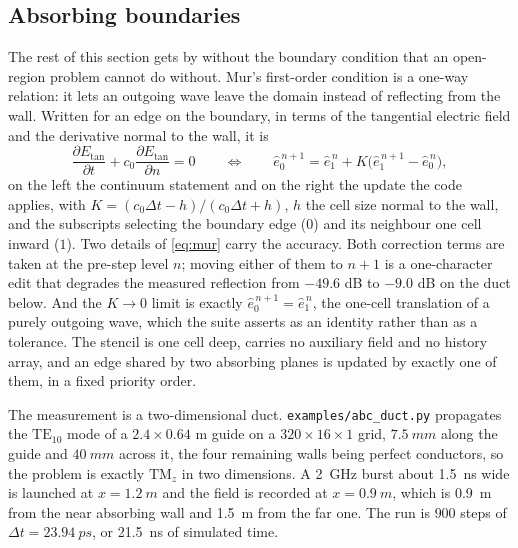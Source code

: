 \subsection{Absorbing boundaries}
\label{sec:res-abc}

The rest of this section gets by without the boundary condition that an open-region problem cannot do
without. Mur's first-order condition \cite{mur1981} is a one-way relation: it lets an outgoing wave leave the
domain instead of reflecting from the wall. Written for an edge on the boundary, in terms of the tangential
electric field and the derivative normal to the wall, it is
\begin{equation}
  \frac{\partial E_{\mathrm{tan}}}{\partial t}
  + c_0\frac{\partial E_{\mathrm{tan}}}{\partial n} = 0
  \qquad\Longleftrightarrow\qquad
  \hat e^{\,n+1}_{0} = \hat e^{\,n}_{1}
  + K\bigl(\hat e^{\,n+1}_{1} - \hat e^{\,n}_{0}\bigr),
  \label{eq:mur}
\end{equation}
on the left the continuum statement and on the right the update the code applies, with
$K=(c_0\Delta t-h)/(c_0\Delta t+h)$, $h$ the cell size normal to the wall, and the subscripts selecting the
boundary edge ($0$) and its neighbour one cell inward ($1$). Two details of \eqref{eq:mur} carry the accuracy.
Both correction terms are taken at the pre-step level $n$; moving either of them to $n+1$ is a one-character
edit that degrades the measured reflection from $-49.6$ dB to $-9.0$ dB on the duct below. And the $K\to0$ limit
is exactly $\hat e^{\,n+1}_{0}=\hat e^{\,n}_{1}$, the one-cell translation of a purely outgoing wave, which the
suite asserts as an identity rather than as a tolerance. The stencil is one cell deep, carries no auxiliary
field and no history array, and an edge shared by two absorbing planes is updated by exactly one of them, in a
fixed priority order.

The measurement is a two-dimensional duct. \texttt{examples/abc\_duct.py} propagates the $\mathrm{TE}_{10}$ mode
of a $2.4\times0.64$ m guide on a $320\times16\times1$ grid, $\SI{7.5}{mm}$ along the guide and
$\SI{40}{mm}$ across it, the four remaining walls being perfect conductors, so the problem is exactly
$\mathrm{TM}_z$ in two dimensions. A \SI{2}{\giga\hertz}
burst about \SI{1.5}{\nano\second} wide is launched at $x=\SI{1.2}{m}$ and the field is recorded at
$x=\SI{0.9}{m}$, which is \SI{0.9}{m} from the near absorbing wall and \SI{1.5}{m} from the far one. The run is
$900$ steps of $\Delta t=\SI{23.94}{ps}$, or \SI{21.5}{\nano\second} of simulated time.

